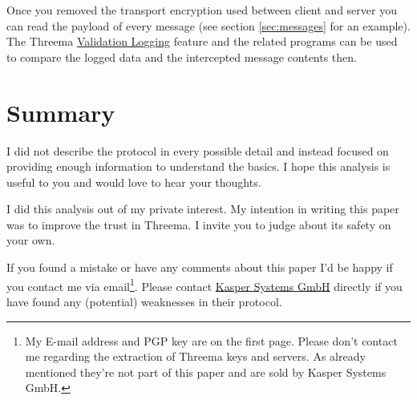 \documentclass[11pt,a4paper,bookmarksopen=true]{article}
\begin{document}
Once you removed the transport encryption used between client and
server you can read the payload of every message (see section \ref{sec:messages} for an example).
The Threema
\href{https://threema.ch/validation/}{Validation Logging} feature and
the related programs can be used to compare the logged data and
the intercepted message contents then.

\section{Summary}

I did not describe the protocol in every possible detail and instead
focused on providing enough information to understand the basics. I
hope this analysis is useful to you and would love to hear your
thoughts.

I did this analysis out of my private interest. My intention in writing
this paper was to improve the trust in Threema.  I invite you to judge
about its safety on your own.

If you found a mistake or have any comments about this paper I'd be
happy if you contact me via email\footnote{My E-mail address and PGP key are on the first page.
  Please don't contact me
  regarding the extraction of Threema keys and servers. As already mentioned they're
  not part of this paper and are sold by Kasper Systems GmbH.}.
Please contact \href{https://threema.ch/en/contact.html}{Kasper
  Systems GmbH} directly if you have found any (potential) weaknesses in
their protocol.
\end{document}
